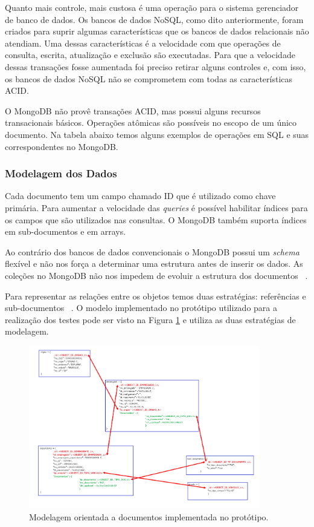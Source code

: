 Quanto mais controle, mais custosa é uma operação para o sistema gerenciador de banco de dados.  Os bancos de dados NoSQL, como dito anteriormente, foram criados para suprir algumas características que os bancos de dados relacionais não atendiam. Uma dessas características é a velocidade com que operações de consulta, escrita, atualização e exclusão são executadas.  Para que a velocidade dessas transações fosse aumentada foi preciso retirar alguns controles e, com isso, os bancos de dados NoSQL não se comprometem com todas as características ACID.

O MongoDB não provê transações ACID, mas possui alguns recursos transacionais básicos. Operações atômicas são possíveis no escopo de um único documento. Na tabela abaixo temos alguns exemplos de operações em SQL e suas correspondentes no MongoDB.

\subsubsection{Modelagem dos Dados}

Cada documento tem um campo chamado ID que é utilizado como chave primária. Para aumentar a velocidade das \textit{queries} é possível habilitar índices para os campos que são utilizados nas consultas. O MongoDB também suporta índices em sub-documentos e em arrays.

Ao contrário dos bancos de dados convencionais o MongoDB possui um \textit{schema} flexível e não nos força a determinar uma estrutura antes de inserir os dados. As coleções no MongoDB não nos impedem de evoluir a estrutura dos documentos ~\cite{Orendanalysisand}.

Para representar as relações entre os objetos temos duas estratégias: referências e sub-documentos ~\cite{Orendanalysisand}. O modelo implementado no protótipo utilizado para a realização dos testes pode ser visto na Figura \ref{fig:modeloorientadodocumentos} e utiliza as duas estratégias de modelagem.

	\begin{figure}[!htbp]
		\begin{center}
			\includegraphics[width=0.9\textwidth]{modelo_orientado_documentos}
		\end{center}
		\caption{ Modelagem orientada a documentos implementada no protótipo.}
		\label{fig:modeloorientadodocumentos}
	\end{figure}

